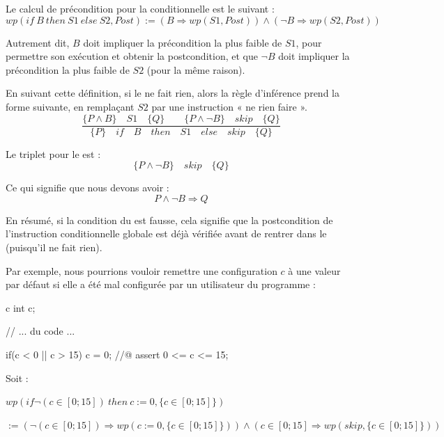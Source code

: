 Le calcul de précondition pour la conditionnelle est le suivant :
$$wp(if\ B\ then\ S1\ else\ S2 , Post) := (B \Rightarrow wp(S1, Post)) \wedge (\neg B \Rightarrow wp(S2, Post))$$


Autrement dit, $B$ doit impliquer la précondition la plus faible de $S1$, pour
permettre son exécution et obtenir la postcondition, et que $\neg B$ doit
impliquer la précondition la plus faible de $S2$ (pour la même raison).





En suivant cette définition, si le  ne fait rien, alors la règle
d'inférence prend la forme suivante, en remplaçant $S2$ par une instruction
« ne rien faire ».
$$\dfrac{\{P \wedge B\}\quad S1\quad \{Q\} \quad \quad \{P \wedge \neg B\}\quad skip\quad \{Q\}}{\{P\}\quad if\quad B\quad then\quad S1\quad else\quad skip \quad \{Q\}}$$



Le triplet pour le  est :
$$\{P \wedge \neg B\}\quad skip\quad \{Q\}$$



Ce qui signifie que nous devons avoir :
$$P \wedge \neg B \Rightarrow Q$$



En résumé, si la condition du  est fausse, cela signifie que la
postcondition de l'instruction conditionnelle globale est déjà vérifiée avant de
rentrer dans le  (puisqu'il ne fait rien).



Par exemple, nous pourrions vouloir remettre une configuration $c$ à une valeur
par défaut si elle a été mal configurée par un utilisateur du programme :



\begin{CodeBlock}{c}
int c;

// ... du code ...

if(c < 0 || c > 15){
  c = 0;
}
//@ assert 0 <= c <= 15;
\end{CodeBlock}



Soit :



$wp(if \neg (c \in [0;15])\ then\ c := 0, \{c \in [0;15]\})$

$:= (\neg (c \in [0;15])\Rightarrow wp(c := 0, \{c \in [0;15]\})) \wedge (c \in [0;15]\Rightarrow wp(skip, \{c \in [0;15]\}))$


